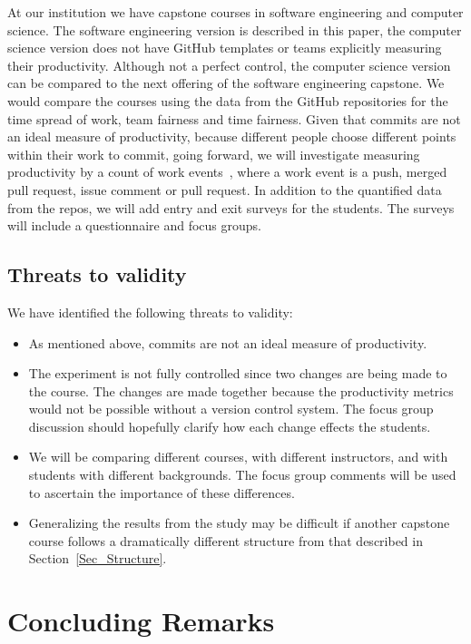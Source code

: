 \documentclass[10pt, conference]{IEEEtran}
\begin{document}
At our institution we have capstone courses in software engineering and computer
science. The software engineering version is described in this paper, the
computer science version does not have GitHub templates or teams explicitly
measuring their productivity.  Although not a perfect control, the computer
science version can be compared to the next offering of the software engineering
capstone.  We would compare the courses using the data from the GitHub
repositories for the time spread of work, team fairness and time fairness.
Given that commits are not an ideal measure of productivity, because different
people choose different points within their work to commit, going forward, we
will investigate measuring productivity by a count of work
events~\cite{saadatAnalyzingProductivityGitHub2020}, where a work event is a
push, merged pull request, issue comment or pull request.  In addition to the
quantified data from the repos, we will add entry and exit surveys for the
students. The surveys will include a questionnaire and focus groups.

\subsection{Threats to validity}

We have identified the following threats to validity:

\begin{itemize}
    \item As mentioned above, commits are not an ideal measure of productivity.
    \item The experiment is not fully controlled since two changes are being
    made to the course.  The changes are made together because the productivity
    metrics would not be possible without a version control system. The focus
    group discussion should hopefully clarify how each change effects the
    students.
    \item We will be comparing different courses, with different instructors,
    and with students with different backgrounds. The focus group comments will
    be used to ascertain the importance of these differences.
    \item Generalizing the results from the study may be difficult if another
    capstone course follows a dramatically different structure from that
    described in Section~\ref{Sec_Structure}.

\end{itemize}

\section{Concluding Remarks} \label{SecConclusions}
\end{document}
